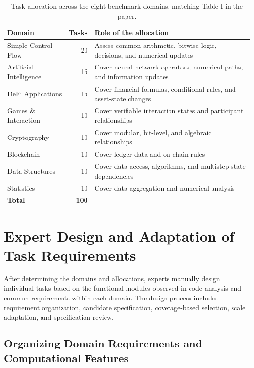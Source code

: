 \documentclass[11pt,a4paper]{article}
\begin{document}
\begin{table}[!htbp]
\centering
\small
\renewcommand{\arraystretch}{1.2}
\begin{tabularx}{\linewidth}{@{}p{.27\linewidth}rL@{}}
\toprule
\textbf{Domain} & \textbf{Tasks} & \textbf{Role of the allocation} \\
\midrule
Simple Control-Flow & 20 & Assess common arithmetic, bitwise logic, decisions, and numerical updates \\
Artificial Intelligence & 15 & Cover neural-network operators, numerical paths, and information updates \\
DeFi Applications & 15 & Cover financial formulas, conditional rules, and asset-state changes \\
Games \& Interaction & 10 & Cover verifiable interaction states and participant relationships \\
Cryptography & 10 & Cover modular, bit-level, and algebraic relationships \\
Blockchain & 10 & Cover ledger data and on-chain rules \\
Data Structures & 10 & Cover data access, algorithms, and multistep state dependencies \\
Statistics & 10 & Cover data aggregation and numerical analysis \\
\midrule
\textbf{Total} & \textbf{100} & \textbf{} \\
\bottomrule
\end{tabularx}
\caption{Task allocation across the eight benchmark domains, matching Table I in the paper.}
\end{table}

\section{Expert Design and Adaptation of Task Requirements}

After determining the domains and allocations, experts manually design individual tasks based on the functional modules observed in code analysis and common requirements within each domain. The design process includes requirement organization, candidate specification, coverage-based selection, scale adaptation, and specification review.

\subsection{Organizing Domain Requirements and Computational Features}
\end{document}
